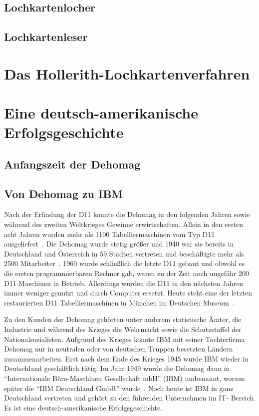 \documentclass[parskip=half]{scrartcl}
\begin{document}
\subsection{Lochkartenlocher}
\subsection{Lochkartenleser}

\section{Das Hollerith-Lochkartenverfahren}

\section{Eine deutsch-amerikanische Erfolgsgeschichte}

\subsection{Anfangszeit der Dehomag}

\subsection{Von Dehomag zu IBM}

Nach der Erfindung der D11 konnte die Dehomag in den folgenden Jahren sowie
während des zweiten Weltkrieges Gewinne erwirtschaften. Allein in den ersten
acht Jahren wurden mehr als 1100 Tabelliermaschinen vom Typ D11
ausgeliefert~\cite{Kist95}. Die Dehomag wurde stetig größer und 1940 war sie
bereits in Deutschland und Österreich in 59 Städten vertreten und beschäftigte
mehr als 2500 Mitarbeiter~\cite{dingwerth}. 1960 wurde schließlich die
letzte D11 gebaut und obwohl es die ersten programmierbaren Rechner gab, waren
zu der Zeit noch ungefähr 200 D11 Maschinen in Betrieb. Allerdings wurden die
D11 in den nächsten Jahren immer weniger genutzt und durch Computer ersetzt. 
Heute steht eine der letzten restaurierten D11 Tabelliermaschinen in München im
Deutschen Museum~\cite{Kist95}.

Zu den Kunden der Dehomag gehörten unter anderem statistische Ämter, die
Industrie und während des Krieges die Wehrmacht sowie die Schutzstaffel der
Nationalsozialisten. Aufgrund des Krieges konnte IBM mit seiner Tochterfirma
Dehomag nur in neutralen oder von deutschen Truppen besetzten Ländern
zusammenarbeiten. Erst nach dem Ende des Krieges 1945 wurde IBM wieder in
Deutschland geschäftlich tätig. Im Jahr 1949 wurde die Dehomag dann in
\enquote{Internationale Büro-Maschinen Gesellschaft mbH} (IBM) umbenannt,
woraus später die \enquote{IBM Deutschland GmbH} wurde~\cite{sendler}.
Noch heute ist IBM in ganz Deutschland vertreten und gehört zu den führenden
Unternehmen im IT- Bereich. Es ist eine deutsch-amerikanische
Erfolgsgeschichte.
\end{document}
